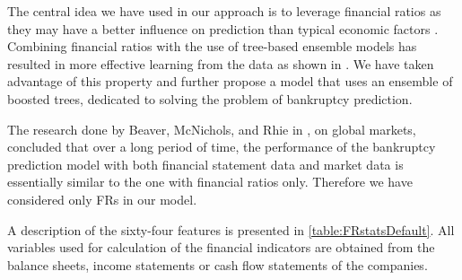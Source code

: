 
The central idea we have used in our approach is to leverage financial ratios as they may have a better influence on prediction than typical economic factors \cite{liang2016financial}. Combining financial ratios with the use of tree-based ensemble models has resulted in more effective learning from the data as shown in \cite{zhou2014bankruptcy}. We have taken advantage of this property and further propose a model that uses an ensemble of boosted trees, dedicated to solving the problem of bankruptcy prediction. 




The research done by Beaver, McNichols, and Rhie in \cite{beaver2005have}, on global markets, concluded that over a long period of time, the performance of the bankruptcy prediction model with both financial statement data and market data is essentially similar to the one with financial ratios only. Therefore we have considered only FRs in our model.

A description of the sixty-four features is presented in \autoref{table:FRstatsDefault}. All variables used for calculation of the financial indicators are obtained from the balance sheets, income statements or cash flow statements of the companies.


